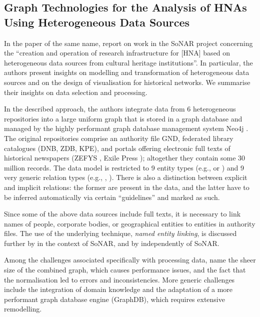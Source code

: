 \subsection{Graph Technologies for the Analysis of HNAs Using Heterogeneous Data Sources}

In the paper of the same name, \textcite{Menzel2020} report on
work in the \gls{SoNAR} project concerning the 
\enquote{creation and operation of research infrastructure
for [\gls{HNA}] based on heterogeneous data sources from cultural heritage institutions}.
In particular, the authors present insights on modelling and transformation
of heterogeneous data sources and on the design of visualisation for historical networks.
We summarise their insights on data selection and processing.

In the described approach, the authors integrate data from 6 heterogeneous repositories
into a large uniform graph that is stored in a graph database
and managed by the highly performant graph database management system Neo4j \autocite{Neo4j}.
The original repositories comprise an authority file \gls{GND},
federated library catalogues (\gls{DNB}, \gls{ZDB}, \gls{KPE}), %
and portals offering electronic full texts of historical newspapers 
%
(\gls{ZEFYS} \autocite{ZEFYS}, Exile Press \autocite{ExilePress});
altogether they contain some 30 million records.
The data model is restricted to 9 entity types (e.g.,  or )
and 9 very generic relation types (e.g., , ).
There is also a distinction between explicit and implicit relations:
the former are present in the data, and the latter have to be inferred automatically via
certain \enquote{guidelines} and marked as such.

Since some of the above data sources include full texts,
it is necessary to link names of people, corporate bodies, or geographical entities
to entities in authority files. The use of the underlying technique,
\emph{named entity linking}, is discussed further by \textcite{Menzel2021}
in the context of \gls{SoNAR},
and by \textcite{Meiners2022} independently of \gls{SoNAR}.

Among the challenges associated specifically with processing data,
\textcite{Menzel2020} name
the sheer size of the combined graph, which causes performance issues,
and the fact that the normalisation led to errors and inconsistencies.
More generic challenges include the integration of domain knowledge
and the adaptation of a more performant graph database engine (GraphDB),
which requires extensive remodelling.

